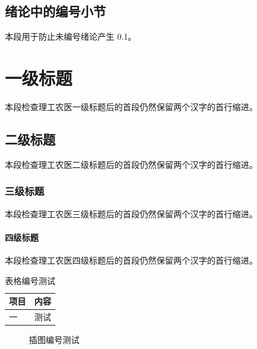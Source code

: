 \documentclass[science,nobibliography]{yibinthesis}
\makeatletter
\newcommand{\yibinassertheadingindent}[1]{%
  \if@afterindent\else
    \PackageError{yibinthesis-smoke}{#1 suppresses the following paragraph indent}{}
  \fi
  \ifdim\parindent=2em\relax\else
    \PackageError{yibinthesis-smoke}{#1 changed parindent from two em}{}
  \fi
}
\newcommand{\yibinassertcounter}[3]{%
  \begingroup
    \edef\yibinactual{#2}%
    \def\yibinexpected{#3}%
    \ifx\yibinactual\yibinexpected\else
      \PackageError{yibinthesis-smoke}{#1 expected #3 but got \yibinactual}{}
    \fi
  \endgroup
}
\makeatother
\begin{document}
\mainmatter
\yibinopeningchapter
\yibinassertheadingindent{Science opening chapter}
\section{绪论中的编号小节}\label{sec:science-intro}
\yibinassertheadingindent{Science opening section}
\yibinassertcounter{Science opening section number}{\thesection}{1.1}
本段用于防止未编号绪论产生 0.1。

\chapter{一级标题}\label{chap:science-first}
\yibinassertheadingindent{Science chapter}
本段检查理工农医一级标题后的首段仍然保留两个汉字的首行缩进。

\section{二级标题}
\yibinassertheadingindent{Science section}
本段检查理工农医二级标题后的首段仍然保留两个汉字的首行缩进。

\subsection{三级标题}
\yibinassertheadingindent{Science subsection}
本段检查理工农医三级标题后的首段仍然保留两个汉字的首行缩进。

\subsubsection{四级标题}
\yibinassertheadingindent{Science subsubsection}
本段检查理工农医四级标题后的首段仍然保留两个汉字的首行缩进。

\begin{table}[htbp]
  \centering
  \caption{表格编号测试}
  \label{tab:science-first}
  \yibinassertcounter{Science table number}{\thetable}{2.1}
  \begin{tabular}{ll}
    \toprule
    项目 & 内容 \\
    \midrule
    一 & 测试 \\
    \bottomrule
  \end{tabular}
\end{table}

\begin{figure}[htbp]
  \centering
  \fbox{\rule{0pt}{2cm}\rule{5cm}{0pt}}
  \caption{插图编号测试}
  \label{fig:science-first}
  \yibinassertcounter{Science figure number}{\thefigure}{2.1}
\end{figure}
\end{document}
